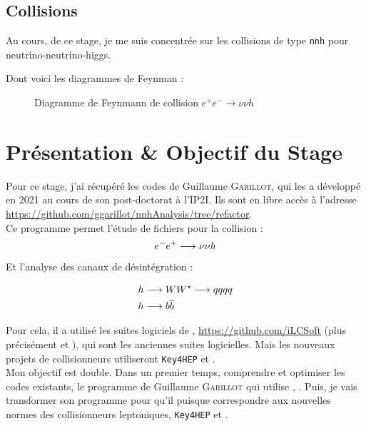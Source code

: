 \subsection{Collisions}

Au cours, de ce stage, je me suis concentrée sur les collisions de type \texttt{nnh} pour neutrino-neutrino-higgs.

Dont voici les diagrammes de Feynman :

\begin{figure}[h!]
	\centering
	\begin{tikzpicture}
	
	\end{tikzpicture}
	\caption{Diagramme de Feynmann de collision $ e^{+} e^{-} \longrightarrow \nu \nu h $}
	\label{Feynman}
\end{figure}

\section{Présentation \& Objectif du Stage}

Pour ce stage, j'ai récupéré les codes de Guillaume \textsc{Garillot}, qui les a développé en 2021 au cours de son post-doctorat à l'IP2I. 
Ils sont en libre accès à l'adresse \url{https://github.com/ggarillot/nnhAnalysis/tree/refactor}.\\

Ce programme \nnhAnalysis permet l'étude de fichiers \SLCIO pour la collision :
\begin{equation}
	\positron \electron \longrightarrow \nnh
\end{equation}

Et l'analyse des canaux de désintégration :

\begin{align}
	h &\longrightarrow W \Wstar \longrightarrow qqqq \\
	h &\longrightarrow b \bbar 
\end{align}

Pour cela, il a utilisé les suites logiciels de \iLCSoft, \url{https://github.com/iLCSoft} (plus précisément \LCIO et \Marlin), qui sont les anciennes suites logicielles.
Mais les nouveaux projets de collisionneurs utiliseront \texttt{Key4HEP} et \Gaudi.\\

Mon objectif est double. Dans un premier temps, comprendre et optimiser les codes existants, \cad le programme \nnhAnalysis de Guillaume \textsc{Garillot} qui utilise \LCIO, \Marlin. 
Puis, je vais transformer son programme pour qu'il puisque correspondre aux nouvelles normes des collisionneurs leptoniques, \texttt{Key4HEP} et \Gaudi.